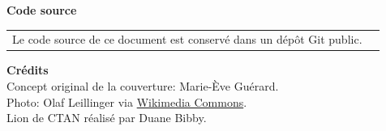 \begin{frame}[t,plain,fragile=singleslide]
  \textbf{Code source} \\
  \begin{tabularx}{0.6\linewidth}{@{}Xl@{}}
    Le code source de ce document est conservé dans un dépôt
    Git public. &
                         \raisebox{-3pt}{%
                         \href{https://github.com/vigou3/formation-latex-ul/}{%
                         \browsebutton}}
  \end{tabularx}
  \vspace*{4mm}

  \textbf{Crédits} \\
  Concept original de la couverture: Marie-Ève Guérard. \\
  Photo: Olaf Leillinger via
  \href{https://commons.wikimedia.org/wiki/File:Suricata.suricatta.6861.jpg}{%
    Wikimedia Commons}. \\
  Lion de CTAN réalisé par Duane Bibby.
  \vfill
\end{frame}

